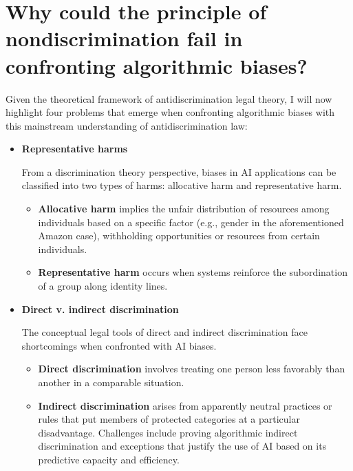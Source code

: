 \section{Why could the principle of nondiscrimination fail in confronting algorithmic biases?}

Given the theoretical framework of antidiscrimination legal theory, I will now highlight four problems that emerge when confronting algorithmic biases with this mainstream understanding of antidiscrimination law:

\begin{itemize}
    \item \textbf{Representative harms}
    
    From a discrimination theory perspective, biases in AI applications can be classified into two types of harms: allocative harm and representative harm.
    
    \begin{itemize}
        \item \textbf{Allocative harm} implies the unfair distribution of resources among individuals based on a specific factor (e.g., gender in the aforementioned Amazon case), withholding opportunities or resources from certain individuals.
        
        \item \textbf{Representative harm} occurs when systems reinforce the subordination of a group along identity lines.
    \end{itemize}
    
    \item \textbf{Direct v. indirect discrimination}
    
    The conceptual legal tools of direct and indirect discrimination face shortcomings when confronted with AI biases.
    
    \begin{itemize}
        \item \textbf{Direct discrimination} involves treating one person less favorably than another in a comparable situation.
        
        \item \textbf{Indirect discrimination} arises from apparently neutral practices or rules that put members of protected categories at a particular disadvantage. Challenges include proving algorithmic indirect discrimination and exceptions that justify the use of AI based on its predictive capacity and efficiency.
    \end{itemize}
    

\end{itemize}
